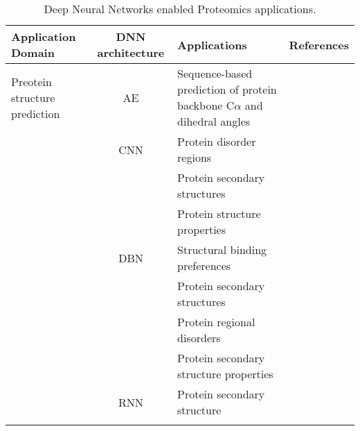 \begin{table}[h!]
\centering
\begin{tabular}{|| l | c | l | l ||}
    \hline
    Application Domain & DNN architecture & Applications & References\\
    \hline \hline
    Preotein structure prediction & AE & Sequence-based prediction of protein backbone C$\alpha$ and dihedral angles & \\
    & CNN & Protein disorder regions & \\
    &     & Protein secondary structures & \\
    &     & Protein structure properties & \\
    & DBN & Structural binding preferences & \\
    &     & Protein secondary structures & \\
    &     & Protein regional disorders & \\
    &     & Protein secondary structure properties & \\
    & RNN & Protein secondary structure & \\
    &   
    \hline
\end{tabular}
\caption{Deep Neural Networks enabled Proteomics applications.}
\label{tab:PS-DNN}
\end{table}